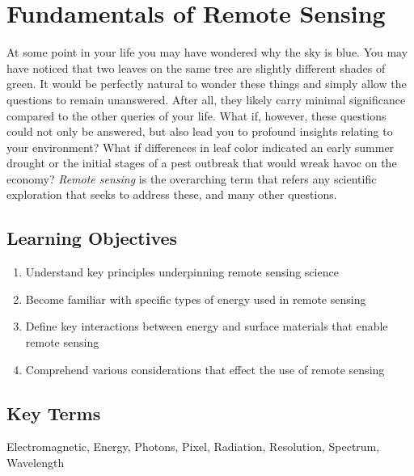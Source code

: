 \documentclass[
]{book}
\providecommand{\tightlist}{%
  \setlength{\itemsep}{0pt}\setlength{\parskip}{0pt}}
\begin{document}
\hypertarget{fundamentals-of-remote-sensing}{%
\chapter{Fundamentals of Remote Sensing}\label{fundamentals-of-remote-sensing}}

At some point in your life you may have wondered why the sky is blue.
You may have noticed that two leaves on the same tree are slightly
different shades of green. It would be perfectly natural to wonder these
things and simply allow the questions to remain unanswered. After all,
they likely carry minimal significance compared to the other queries of
your life. What if, however, these questions could not only be answered,
but also lead you to profound insights relating to your environment?
What if differences in leaf color indicated an early summer drought or
the initial stages of a pest outbreak that would wreak havoc on the
economy? \emph{Remote sensing} is the overarching term that refers any
scientific exploration that seeks to address these, and many other
questions.

\hypertarget{learning-objectives-10}{%
\section*{Learning Objectives}\label{learning-objectives-10}}

\begin{enumerate}
\def\labelenumi{\arabic{enumi}.}
\tightlist
\item
  Understand key principles underpinning remote sensing science
\item
  Become familiar with specific types of energy used in remote sensing
\item
  Define key interactions between energy and surface materials that
  enable remote sensing
\item
  Comprehend various considerations that effect the use of remote sensing
\end{enumerate}

\hypertarget{key-terms-10}{%
\section*{Key Terms}\label{key-terms-10}}

Electromagnetic, Energy, Photons, Pixel, Radiation, Resolution,
Spectrum, Wavelength
\end{document}
